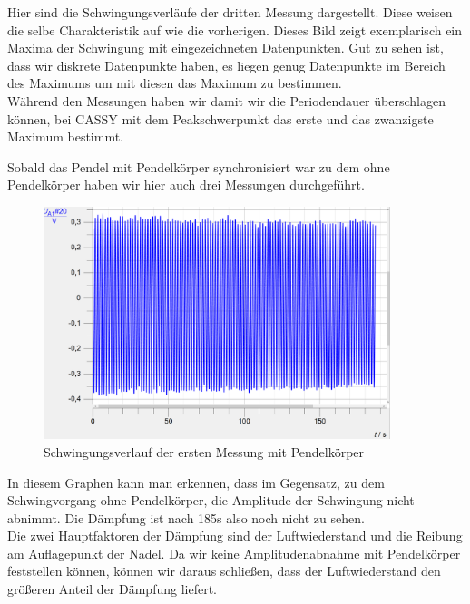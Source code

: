 \documentclass[twoside]{protokoll}
\begin{document}
Hier sind die Schwingungsverläufe der dritten Messung dargestellt. Diese weisen die selbe Charakteristik auf wie die vorherigen.
Dieses Bild zeigt exemplarisch ein Maxima der Schwingung mit eingezeichneten Datenpunkten. 
Gut zu sehen ist, dass wir diskrete Datenpunkte haben, es liegen genug Datenpunkte im Bereich des Maximums um mit diesen das Maximum zu bestimmen.\\
Während den Messungen haben wir damit wir die Periodendauer überschlagen können, bei CASSY mit dem Peakschwerpunkt das erste und das zwanzigste Maximum bestimmt.

Sobald das Pendel mit Pendelkörper synchronisiert war zu dem ohne Pendelkörper haben wir hier auch drei Messungen durchgeführt.
\begin{figure}[H]
    \centering
    \includegraphics[width=0.9\textwidth]{plots/gewicht-1-komplett.pdf}
    \caption{Schwingungsverlauf der ersten Messung mit Pendelkörper}
    \end{figure}

In diesem Graphen kann man erkennen, dass im Gegensatz, zu dem Schwingvorgang ohne Pendelkörper, die Amplitude der Schwingung nicht abnimmt.
Die Dämpfung ist nach 185s also noch nicht zu sehen.\\

Die zwei Hauptfaktoren der Dämpfung sind der Luftwiederstand und die Reibung am Auflagepunkt der Nadel. 
Da wir keine Amplitudenabnahme mit Pendelkörper feststellen können, können wir daraus schließen, dass der Luftwiederstand den größeren Anteil der Dämpfung liefert.
\end{document}
